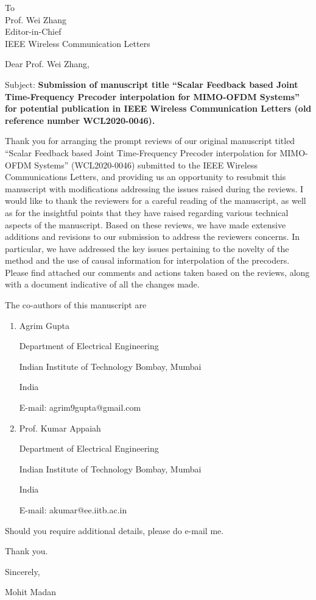 \documentclass{letter}
\date{\today}
\begin{document}
\begin{letter}{To\\
Prof. Wei Zhang\\
Editor-in-Chief\\
IEEE Wireless Communication Letters}
\vspace{0.5in}


\opening{Dear Prof. Wei Zhang,}

Subject: \textbf{Submission of manuscript title ``Scalar Feedback based Joint Time-Frequency Precoder
  interpolation for  MIMO-OFDM Systems'' for potential publication in
  IEEE Wireless Communication Letters (old reference number  WCL2020-0046).}

Thank you for arranging the prompt reviews of our original manuscript
titled ``Scalar Feedback based Joint Time-Frequency Precoder
interpolation for MIMO-OFDM Systems'' (WCL2020-0046) submitted to the
IEEE Wireless Communications Letters, and providing us an opportunity
to resubmit this manuscript with modifications addressing the issues
raised during the reviews. I would like to thank the reviewers for a
careful reading of the manuscript, as well as for the insightful
points that they have raised regarding various technical aspects of
the manuscript. Based on these reviews, we have made extensive
additions and revisions to our submission to address the reviewers
concerns. In particular, we have addressed the key issues pertaining
to the novelty of the method and the use of causal information for
interpolation of the precoders. Please find attached our comments and
actions taken based on the reviews, along with a document indicative
of all the changes made.

The co-authors of this manuscript are
\begin{enumerate}
\item  Agrim Gupta

Department of Electrical  Engineering

Indian Institute of Technology Bombay, Mumbai

India

E-mail: agrim9gupta@gmail.com


\item Prof. Kumar Appaiah

Department of Electrical  Engineering

Indian Institute of Technology Bombay, Mumbai

India

E-mail: akumar@ee.iitb.ac.in

\end{enumerate}

Should you require additional details, please do e-mail me.

Thank you.
\vspace{0.3in}

Sincerely,

Mohit Madan

\end{letter}
\end{document}
